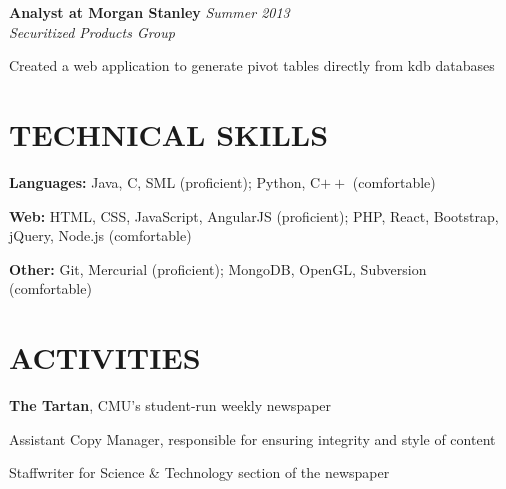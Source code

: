 \documentclass[margin, 11pt]{res} %
\begin{document}
\begin{resume}
\vspace{3pt}

{\bf Analyst at Morgan Stanley} \hfill {\sl Summer 2013} \\
{\sl Securitized Products Group}
\begin{itemize} \itemsep -2pt %
{\small 
\item Created a web application to generate pivot tables directly from kdb databases 
}
\end{itemize}
 

\section{TECHNICAL SKILLS} 

{\bf Languages:} 
Java, C, SML (proficient); Python, C$++$ (comfortable)

\vspace{5pt}

{\bf Web:}
HTML, CSS, JavaScript, AngularJS (proficient); PHP, React, Bootstrap, jQuery, Node.js (comfortable)

\vspace{5pt}

{\bf Other:}
Git, Mercurial (proficient); MongoDB, OpenGL, Subversion (comfortable)


\section{ACTIVITIES} 

{\bf The Tartan}, CMU's student-run weekly newspaper

\begin{itemize} \itemsep -2pt
{\small \item Assistant Copy Manager, responsible for ensuring integrity and style of content
\item Staffwriter for Science \& Technology section of the newspaper}
\end{itemize} 


\end{resume}
\end{document}
